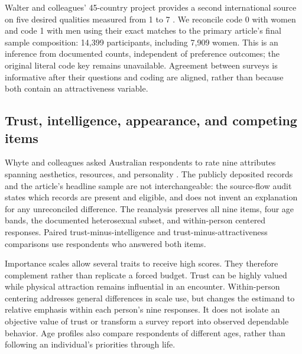 Walter and colleagues' 45-country project provides a second international source on five desired qualities measured from 1 to 7 \citep{walter2020}. We reconcile code 0 with women and code 1 with men using their exact matches to the primary article's final sample composition: 14,399 participants, including 7,909 women. This is an inference from documented counts, independent of preference outcomes; the original literal code key remains unavailable.  Agreement between surveys is informative after their questions and coding are aligned, rather than because both contain an attractiveness variable.


\subsection{Trust, intelligence, appearance, and competing items}

Whyte and colleagues asked Australian respondents to rate nine attributes spanning aesthetics, resources, and personality \citep{whyte2021}. The publicly deposited records and the article's headline sample are not interchangeable: the source-flow audit states which records are present and eligible, and does not invent an explanation for any unreconciled difference. The reanalysis preserves all nine items, four age bands, the documented heterosexual subset, and within-person centered responses. Paired trust-minus-intelligence and trust-minus-attractiveness comparisons use respondents who answered both items.



Importance scales allow several traits to receive high scores. They therefore complement rather than replicate a forced budget. Trust can be highly valued while physical attraction remains influential in an encounter. Within-person centering addresses general differences in scale use, but changes the estimand to relative emphasis within each person's nine responses. It does not isolate an objective value of trust or transform a survey report into observed dependable behavior. Age profiles also compare respondents of different ages, rather than following an individual's priorities through life.

